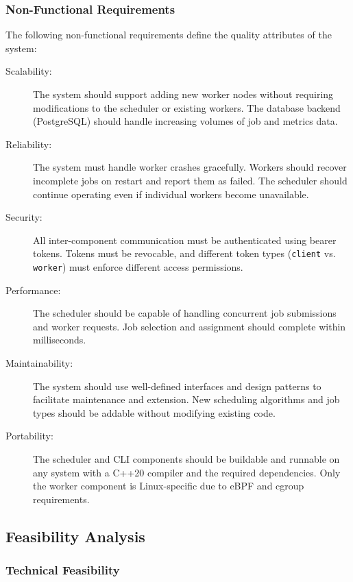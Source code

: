 \subsubsection{Non-Functional Requirements}

The following non-functional requirements define the quality attributes of the system:

\begin{description}
	\item[Scalability:] The system should support adding new worker nodes without requiring modifications to the scheduler or existing workers. The database backend (PostgreSQL) should handle increasing volumes of job and metrics data.

	\item[Reliability:] The system must handle worker crashes gracefully. Workers should recover incomplete jobs on restart and report them as failed. The scheduler should continue operating even if individual workers become unavailable.

	\item[Security:] All inter-component communication must be authenticated using bearer tokens. Tokens must be revocable, and different token types (\texttt{client} vs. \texttt{worker}) must enforce different access permissions.

	\item[Performance:] The scheduler should be capable of handling concurrent job submissions and worker requests. Job selection and assignment should complete within milliseconds.

	\item[Maintainability:] The system should use well-defined interfaces and design patterns to facilitate maintenance and extension. New scheduling algorithms and job types should be addable without modifying existing code.

	\item[Portability:] The scheduler and CLI components should be buildable and runnable on any system with a C++20 compiler and the required dependencies. Only the worker component is Linux-specific due to eBPF and cgroup requirements.
\end{description}

\subsection{Feasibility Analysis}

\subsubsection{Technical Feasibility}

